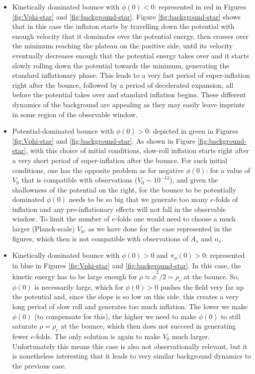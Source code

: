\documentclass[aps,prd,11pt,showkeys,nofootinbib]{revtex4-2}
\begin{document}
\begin{itemize}

\item Kinetically dominated bounce with $\phi(0) < 0$: represented in red in Figures \ref{fig:Vphi-star} and \ref{fig:background-star}. Figure \ref{fig:background-star} shows that in this case the inflaton starts by travelling down the potential with enough velocity that it dominates over the potential energy, then crosses over the minimum reaching the plateau on the positive side, until its velocity eventually decreases enough that the potential energy takes over and it starts slowly rolling down the potential towards the minimum, generating the standard inflationary phase. This leads to a very fast period of super-inflation right after the bounce, followed by a period of decelerated expansion, all before the potential takes over and standard inflation begins. These different dynamics of the background are appealing as they may easily leave imprints in some region of the observable window. 

\item Potential-dominated bounce with $\phi(0) > 0$: depicted in green in Figures \ref{fig:Vphi-star} and \ref{fig:background-star}. As shown in Figure \ref{fig:background-star}, with this choice of initial conditions, slow-roll inflation starts right after a very short period of super-inflation after the bounce. For such initial conditions, one has the opposite problem as for negative $\phi(0)$: for a value of $V_0$ that is compatible with observations ($V_0 \sim 10^{-13}$), and given the shallowness of the potential on the right, for the bounce to be potentially dominated $\phi(0)$ needs to be so big that we generate too many $e$-folds of inflation and any pre-inflationary effects will not fall in the observable window. To limit the number of $e$-folds one would need to choose a much larger (Planck-scale) $V_0$, as we have done for the case represented in the figures, which then is not compatible with observations of $A_s$ and $n_s$.

\item Kinetically dominated bounce with $\phi(0) > 0$ and $\pi_\phi(0) > 0$: represented in blue in Figures \ref{fig:Vphi-star} and \ref{fig:background-star}. In this case, the kinetic energy has to be large enough for $\rho \approx \dot\phi^2/2 = \rho_c$ at the bounce. So, $\dot\phi(0)$ is necessarily large, which for $\phi(0)>0$ pushes the field very far up the potential and, since the slope is so low on this side, this creates a very long period of slow roll and generates too much inflation. The lower we make $\phi(0)$ (to compensate for this), the higher we need to make $\dot\phi(0)$ to still saturate $\rho=\rho_c$ at the bounce, which then does not succeed in generating fewer $e$-folds. The only solution is again to make $V_0$ much larger. Unfortunately this means this case is also not observationally relevant, but it is nonetheless interesting that it leads to very similar background dynamics to the previous case.


\end{itemize}
\end{document}
